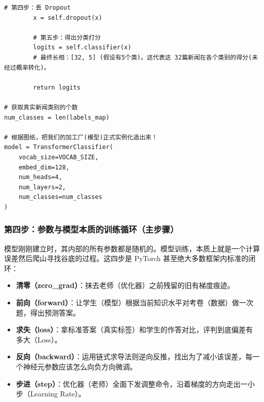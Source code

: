 \documentclass[10pt]{article}
\numberwithin{equation}{section}
\theoremstyle{plain}
\theoremstyle{definition}
\theoremstyle{remark}
\begin{document}
\begin{CodeBox}
\begin{lstlisting}[style=PythonStyle]
        # 第四步：丢 Dropout
        x = self.dropout(x)
        
        # 第五步：得出分类打分
        logits = self.classifier(x)
        # 最终长相：[32, 5] (假设有5个类)。这代表这 32篇新闻在各个类别的得分(未经过概率转化)。
        
        return logits

# 获取真实新闻类别的个数
num_classes = len(labels_map)

# 根据图纸，把我们的加工厂(模型)正式实例化造出来！
model = TransformerClassifier(
    vocab_size=VOCAB_SIZE, 
    embed_dim=128, 
    num_heads=4, 
    num_layers=2, 
    num_classes=num_classes
)
\end{lstlisting}
\end{CodeBox}

\subsubsection{第四步：参数与模型本质的训练循环（主步骤）}

模型刚刚建立时，其内部的所有参数都是随机的。模型训练，本质上就是一个计算误差然后爬山寻找谷底的过程。这四步是 PyTorch 甚至绝大多数框架内标准的闭环：
\begin{itemize}
	\item \textbf{清零（zero\_grad）}：抹去老师（优化器）之前残留的旧有梯度痕迹。
	\item \textbf{前向（forward）}：让学生（模型）根据当前知识水平对考卷（数据）做一次题，得出预测答案。
	\item \textbf{求失（loss）}：拿标准答案（真实标签）和学生的作答对比，评判到底偏差有多大（Loss）。
	\item \textbf{反向（backward）}：运用链式求导法则逆向反推，找出为了减小该误差，每一个神经元参数应该怎么向负方向微调。
	\item \textbf{步进（step）}：优化器（老师）全面下发调整命令，沿着梯度的方向走出一小步（Learning Rate）。
\end{itemize}
\end{document}
